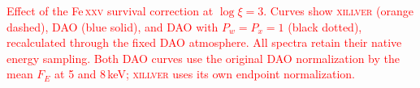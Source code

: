 \caption{\textcolor{red}{Effect of the Fe\,\textsc{xxv} survival correction
at $\log\xi=3$. Curves show \textsc{xillver} (orange dashed),
\textsc{DAO} (blue solid), and \textsc{DAO} with $P_w=P_x=1$
(black dotted), recalculated through the fixed DAO atmosphere.
All spectra retain their native energy sampling. Both DAO curves use
the original DAO normalization by the mean $F_E$ at 5 and 8\,keV;
\textsc{xillver} uses its own endpoint normalization.}}
\label{fig:fe_survival_comparison}
